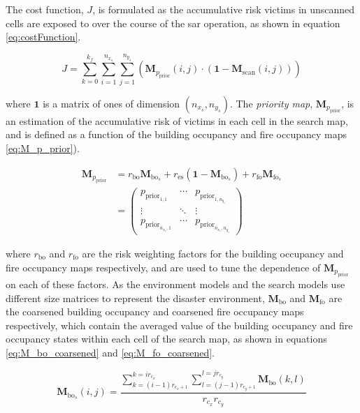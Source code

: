 \documentclass[conference]{IEEEtran}
\begin{document}
The cost function, $J$, is formulated as the accumulative risk victims in unscanned cells are exposed to over the course of the \gls{sar} operation, as shown in equation \ref{eq:costFunction}.

\begin{equation} \label{eq:costFunction}
    J = \sum_{k=0}^{k_{f}} \sum_{i=1}^{n_{x_{s}}} \sum_{j=1}^{n_{y_{s}}} ( \bm{M}_{p_{\text{prior}}}(i,j) \cdot (\bm{1} - \bm{M}_{\text{scan}}(i,j)))
\end{equation}

where $\bm{1}$ is a matrix of ones of dimension $(n_{x_{s}}, n_{y_{s}})$.
The \textit{priority map}, $\bm{M}_{p_{\text{prior}}}$, is an estimation of the accumulative risk of victims in each cell in the search map, and is defined as a function of the building occupancy and fire occupancy maps \ref{eq:M_p_prior}).

\begin{equation} \label{eq:M_p_prior}
    \begin{split}
        \bm{M}_{p_{\text{prior}}} 
        & = 
        r_{\text{bo}} \bm{M}_{\text{bo}_{s}} + r_{\text{es}} (\bm{1} - \bm{M}_{\text{bo}_{s}}) + r_{\text{fo}} \bm{M}_{\text{fo}_{s}} \\
        & = 
        \begin{pmatrix}
            p_{\text{prior}_{1,1}} & \cdots & p_{\text{prior}_{1,n_{y_{s}}}} \\
            \vdots & \ddots & \vdots \\
            p_{\text{prior}_{n_{x_{s}},1}} & \cdots & p_{\text{prior}_{n_{x_{s}},n_{y_{s}}}}
        \end{pmatrix}
    \end{split}
\end{equation}

where $r_{\text{bo}}$ and $r_{\text{fo}}$ are the risk weighting factors for the building occupancy and fire occupancy maps respectively, and are used to tune the dependence of $\bm{M}_{p_{\text{prior}}}$ on each of these factors.
As the environment models and the search models use different size matrices to represent the disaster environment, $\bm{M}_{\text{bo}}$ and $\bm{M}_{\text{fo}}$ are the coarsened building occupancy and coarsened fire occupancy maps respectively, which contain the averaged value of the building occupancy and fire occupancy states within each cell of the search map, as shown in equations \ref{eq:M_bo_coarsened} and \ref{eq:M_fo_coarsened}.

\begin{equation} \label{eq:M_bo_coarsened}
    \bm{M}_{\text{bo}_{s}}(i,j) = 
    \frac{\sum_{k=(i-1) r_{c_{x}+1}}^{k=i r_{c_{x}}} \sum_{l=(j-1) r_{c_{y}+1}}^{l=j r_{c_{y}}} \bm{M}_{\text{bo}}(k,l)}{{r_{c_{x}} r_{c_{y}}}}
\end{equation}
\end{document}
